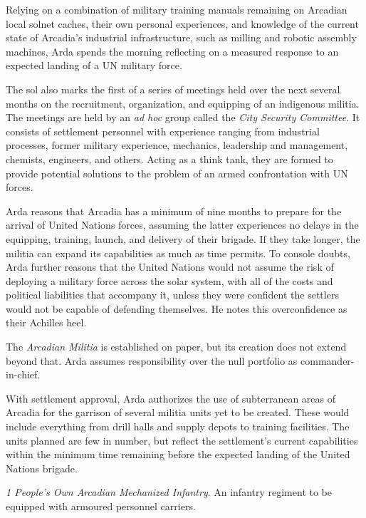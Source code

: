 Relying on a combination of military training manuals remaining on Arcadian local solnet caches, their own personal experiences, and knowledge of the current state of Arcadia's industrial infrastructure, such as milling and robotic assembly machines, Arda spends the morning reflecting on a measured response to an expected landing of a UN military force. 

The sol also marks the first of a series of meetings held over the next several months on the recruitment, organization, and equipping of an indigenous militia. The meetings are held by an {\it ad hoc} group called the {\it City Security Committee}. It consists of settlement personnel with experience ranging from industrial processes, former military experience, mechanics, leadership and management, chemists, engineers, and others. Acting as a think tank, they are formed to provide potential solutions to the problem of an armed confrontation with UN forces.

Arda reasons that Arcadia has a minimum of nine months to prepare for the arrival of United Nations forces, assuming the latter experiences no delays in the equipping, training, launch, and delivery of their brigade. If they take longer, the militia can expand its capabilities as much as time permits. To console doubts, Arda further reasons that the United Nations would not assume the risk of deploying a military force across the solar system, with all of the costs and political liabilities that accompany it, unless they were confident the settlers would not be capable of defending themselves. He notes this overconfidence as their Achilles heel.

The {\it Arcadian Militia} is established on paper, but its creation does not extend beyond that. Arda assumes responsibility over the null portfolio as commander-in-chief.
\StopTimelineDate

With settlement approval, Arda authorizes the use of subterranean areas of Arcadia for the garrison of several militia units yet to be created. These would include everything from drill halls and supply depots to training facilities. The units planned are few in number, but reflect the settlement's current capabilities within the minimum time remaining before the expected landing of the United Nations brigade.

\startitemize[4]
\item {\it 1 People's Own Arcadian Mechanized Infantry}. An infantry regiment to be equipped with armoured personnel carriers.

